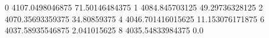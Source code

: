 0 4107.0498046875 71.50146484375
1 4084.845703125 49.29736328125
2 4070.35693359375 34.80859375
4 4046.701416015625 11.153076171875
6 4037.58935546875 2.041015625
8 4035.54833984375 0.0
